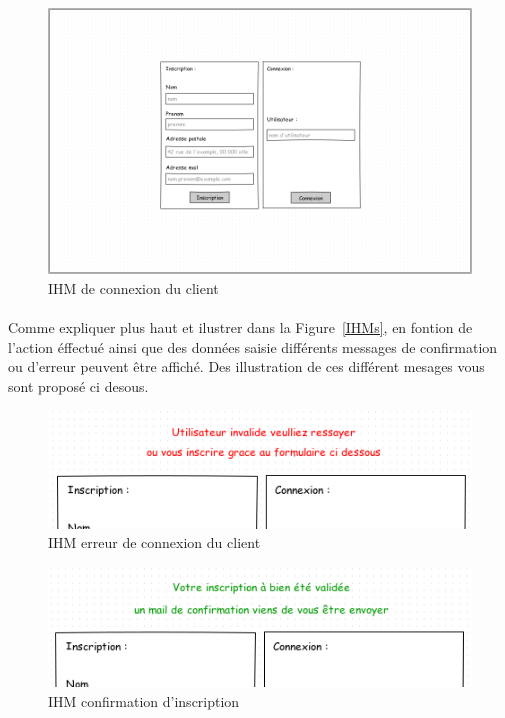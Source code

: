 \documentclass[a4paper,11pt]{article}
\begin{document}
\begin{figure}[H]
  \begin{center}
    \includegraphics[width=15cm]{../../IHM/IHM_connection_utilisateur.png}
    \caption{IHM de connexion du client}
  \end{center}
\end{figure}

\paragraph{}
Comme expliquer plus haut et ilustrer dans la Figure~\ref{IHMs}, en fontion de l'action éffectué ainsi que des données saisie différents messages de confirmation ou d'erreur peuvent être affiché. Des illustration de ces différent mesages vous sont proposé ci desous.

\begin{figure}[H]
  \begin{center}
    \includegraphics[width=15cm]{../../IHM/IHM_connection_utilisateur_erreur_co_z.png}
    \caption{IHM erreur de connexion du client}
  \end{center}
\end{figure}

\begin{figure}[H]
  \begin{center}
    \includegraphics[width=15cm]{../../IHM/IHM_connection_utilisateur_conf_ins_z.png}
    \caption{IHM confirmation d'inscription}
  \end{center}
\end{figure}
\end{document}
